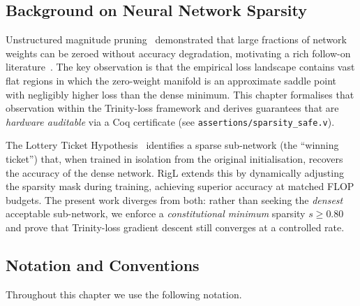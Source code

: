\subsection{Background on Neural Network Sparsity}
\label{subsec:background}

Unstructured magnitude pruning~\cite{hanetal2015deep} demonstrated that large
fractions of network weights can be zeroed without accuracy degradation,
motivating a rich follow-on literature~\cite{blalock2020state}.  The key
observation is that the empirical loss landscape contains vast flat regions in
which the zero-weight manifold is an approximate saddle point with negligibly
higher loss than the dense minimum.  This chapter formalises that observation
within the Trinity-loss framework and derives guarantees that are \emph{hardware
auditable} via a Coq certificate (see \texttt{assertions/sparsity\_safe.v}).

The Lottery Ticket Hypothesis~\cite{frankle2019lottery} identifies a sparse
sub-network (the ``winning ticket'') that, when trained in isolation from the
original initialisation, recovers the accuracy of the dense network.  RigL
\cite{evci2020rigging} extends this by dynamically adjusting the sparsity mask
during training, achieving superior accuracy at matched FLOP budgets.  The
present work diverges from both: rather than seeking the \emph{densest}
acceptable sub-network, we enforce a \emph{constitutional minimum} sparsity
$s \geq 0.80$ and prove that Trinity-loss gradient descent still converges at a
controlled rate.

\subsection{Notation and Conventions}
\label{subsec:notation}

Throughout this chapter we use the following notation.


